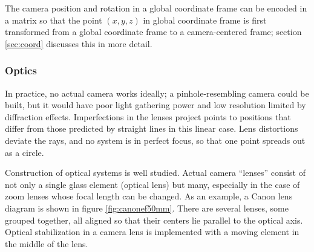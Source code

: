 The camera position and rotation in a global coordinate frame can be encoded in a matrix so that the point $(x,y,z)$ in global coordinate frame is first transformed from a global coordinate frame to a camera-centered frame; section \ref{sec:coord} discusses this in more detail.


\subsubsection{Optics} %


In practice, no actual camera works ideally; a pinhole-resembling camera could be built, but it would have poor light gathering power and low resolution limited by diffraction effects. \cite{todo}
Imperfections in the lenses project points to positions that differ from those predicted by straight lines in this linear case.
Lens distortions deviate the rays, and no system is in perfect focus, so that one point spreads out as a circle.

Construction of optical systems is well studied. \cite{kingslake1989history}
Actual camera ``lenses'' consist of not only a single glass element (optical lens) but many, especially in the case of zoom lenses whose focal length can be changed.
As an example, a Canon lens diagram is shown in figure \ref{fig:canonef50mm}.
There are several lenses, some grouped together, all aligned so that their centers lie parallel to the optical axis.
Optical stabilization in a camera lens is implemented with a moving element in the middle of the lens.


